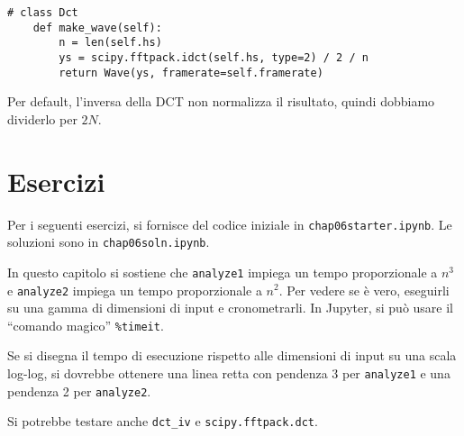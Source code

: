 \documentclass[12pt,a4paper]{book}
\begin{document}
\begin{verbatim} 
# class Dct
    def make_wave(self):
        n = len(self.hs)
        ys = scipy.fftpack.idct(self.hs, type=2) / 2 / n
        return Wave(ys, framerate=self.framerate)
 \end{verbatim} 

Per default, l'inversa della DCT non normalizza il risultato, quindi dobbiamo dividerlo per $2N$.

\section{Esercizi} 

Per i seguenti esercizi, si fornisce del codice iniziale in {\tt chap06starter.ipynb}. Le soluzioni sono in {\tt chap06soln.ipynb}.

\begin{exercise} In questo capitolo si sostiene che {\tt analyze1} impiega un tempo proporzionale a $n^3$ e {\tt analyze2} impiega un tempo proporzionale a $n^2$. Per vedere se è vero, eseguirli su una gamma di dimensioni di input e cronometrarli. In Jupyter, si può usare il ``comando magico'' \verb"%timeit".

Se si disegna il tempo di esecuzione rispetto alle dimensioni di input su una scala log-log, si dovrebbe ottenere una linea retta con pendenza 3 per {\tt analyze1} e una pendenza 2 per {\tt analyze2}.

Si potrebbe testare anche \verb"dct_iv" e {\tt scipy.fftpack.dct}.

\end{exercise} 
\end{document}
